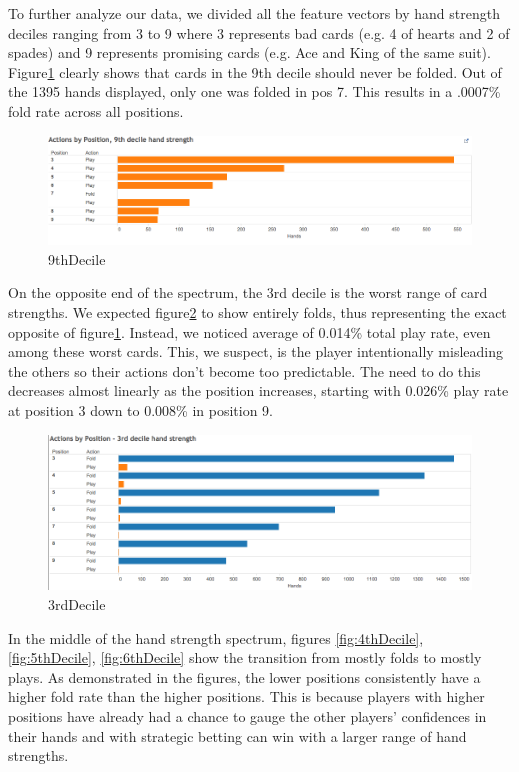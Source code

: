 \documentclass[twoside]{article}
\begin{document}
\begin{multicols}{2}
To further analyze our data, we divided all the feature vectors by hand strength deciles ranging from 3 to 9 where 3 represents bad cards (e.g. 4 of hearts and 2 of spades) and 9 represents promising cards (e.g. Ace and King of the same suit). Figure\ref{fig:9thDecile} clearly shows that cards in the 9th decile should never be folded. Out of the 1395 hands displayed, only one was folded in pos 7. This results in a .0007\% fold rate across all positions. 

\begin{figure}[H]
  \centering
  \centerline{\includegraphics[width=1.1\columnwidth]{9thDecile.png}}
   \caption{9thDecile}
  \label{fig:9thDecile}
\end{figure}

On the opposite end of the spectrum, the 3rd decile is the worst range of card strengths. We expected figure\ref{fig:3rdDecile} to show entirely folds, thus representing the exact opposite of figure\ref{fig:9thDecile}. Instead, we noticed average of 0.014\% total play rate, even among these worst cards. This, we suspect, is the player intentionally misleading the others so their actions don't become too predictable. The need to do this decreases almost linearly as the position increases, starting with 0.026\% play rate at position 3 down to 0.008\% in position 9. 

\begin{figure}[H]
  \centering
  \centerline{\includegraphics[width=1.1\columnwidth]{3rdDecile.png}}
   \caption{3rdDecile}
  \label{fig:3rdDecile}
\end{figure}

In the middle of the hand strength spectrum, figures \ref{fig:4thDecile}, \ref{fig:5thDecile}, \ref{fig:6thDecile} show the transition from mostly folds to mostly plays. As demonstrated in the figures, the lower positions consistently have a higher fold rate than the higher positions. This is because players with higher positions have already had a chance to gauge the other players' confidences in their hands and with strategic betting can win with a larger range of hand strengths. 


\end{multicols}
\end{document}

